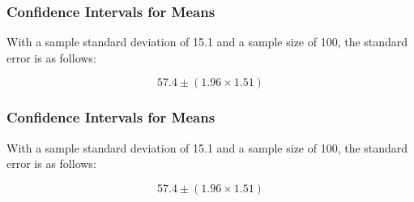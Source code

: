 \documentclass{beamer}
\begin{document}
\begin{frame}
\frametitle{Confidence Intervals for Means}
\LARGE
\vspace{-2cm}

 With a sample standard deviation of 15.1 and a sample size of 100, the standard error is as follows:
 
 
\[ 57.4 \pm \left( 1.96 \times 1.51 \right) \]


\end{frame}
\begin{frame}
\frametitle{Confidence Intervals for Means}
\LARGE
\vspace{-2cm}

 With a sample standard deviation of 15.1 and a sample size of 100, the standard error is as follows:
 
 
\[ 57.4 \pm \left( 1.96 \times 1.51 \right) \]


\end{frame}

\end{document}
